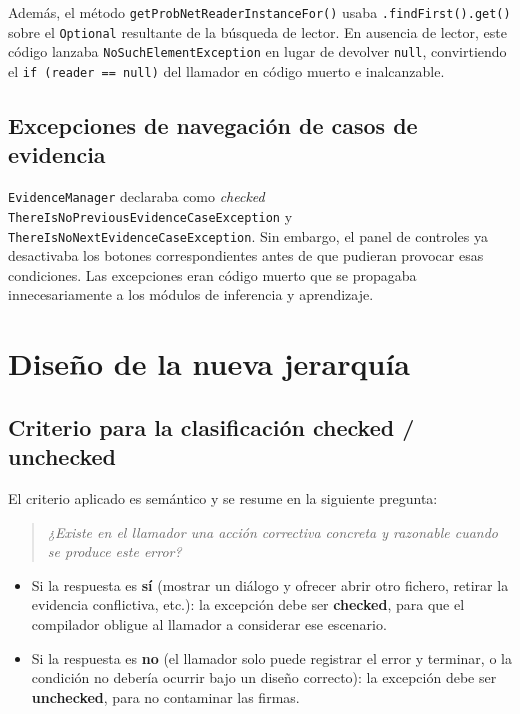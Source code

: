 \documentclass[12pt,a4paper]{article}
\begin{document}
Además, el método \texttt{getProbNetReaderInstanceFor()} usaba
\texttt{.findFirst().get()} sobre el \texttt{Optional} resultante de la
búsqueda de lector. En ausencia de lector, este código lanzaba
\texttt{NoSuchElementException} en lugar de devolver \texttt{null}, convirtiendo
el \texttt{if (reader == null)} del llamador en código muerto e inalcanzable.

\subsection{Excepciones de navegación de casos de evidencia}
\label{sec:prob-nav}

\texttt{EvidenceManager} declaraba como \emph{checked}
\texttt{ThereIsNoPreviousEvidenceCaseException} y
\texttt{ThereIsNoNextEvidenceCaseException}. Sin embargo, el panel de controles
ya desactivaba los botones correspondientes antes de que pudieran provocar esas
condiciones. Las excepciones eran código muerto que se propagaba innecesariamente
a los módulos de inferencia y aprendizaje.

\section{Diseño de la nueva jerarquía}
\label{sec:diseno}

\subsection{Criterio para la clasificación checked / unchecked}
\label{sec:criterio}

El criterio aplicado es semántico y se resume en la siguiente pregunta:

\begin{quote}
\textit{¿Existe en el llamador una acción correctiva concreta y razonable cuando
se produce este error?}
\end{quote}

\begin{itemize}
  \item Si la respuesta es \textbf{sí} (mostrar un diálogo y ofrecer abrir
    otro fichero, retirar la evidencia conflictiva, etc.): la excepción debe
    ser \textbf{checked}, para que el compilador obligue al llamador a
    considerar ese escenario.
  \item Si la respuesta es \textbf{no} (el llamador solo puede registrar el
    error y terminar, o la condición no debería ocurrir bajo un diseño correcto):
    la excepción debe ser \textbf{unchecked}, para no contaminar las firmas.
\end{itemize}
\end{document}

